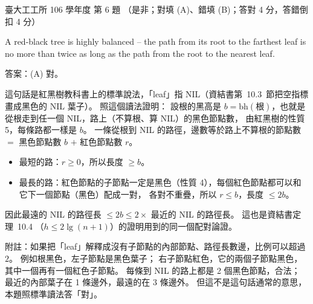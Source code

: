 \begin{pastexam}[label={px:ntu-106-ie-ds-06}]{臺大工工所 106 學年度 第 6 題}
（是非；對填 (A)、錯填 (B)；答對 4 分，答錯倒扣 4 分）

A red-black tree is highly balanced -- the path from its root to the farthest leaf is no more than
twice as long as the path from the root to the nearest leaf.
\end{pastexam}

\begin{pastsoln}
答案：(A) 對。

這句話是紅黑樹教科書上的標準說法，「leaf」指 NIL（資結書第~10.3~節把空指標畫成黑色的 NIL 葉子）。 照這個讀法證明：
設根的黑高是 $b = \mathrm{bh}(\text{根})$，也就是從根走到任一個 NIL，路上（不算根、算 NIL）的黑色節點數，
由紅黑樹的性質 5，每條路都一樣是 $b$。 一條從根到 NIL 的路徑，邊數等於路上不算根的節點數
$=$ 黑色節點數 $b$ $+$ 紅色節點數 $r$。
\begin{itemize}
\item 最短的路：$r \ge 0$，所以長度 $\ge b$。
\item 最長的路：紅色節點的子節點一定是黑色（性質 4），每個紅色節點都可以和它下一個節點（黑色）配成一對，
各對不重疊，所以 $r \le b$，長度 $\le 2b$。
\end{itemize}
因此最遠的 NIL 的路徑長 $\le 2b \le 2 \times$ 最近的 NIL 的路徑長。 這也是資結書定理~10.4
（$h \le 2\lg(n + 1)$）的證明用到的同一個配對論證。

附註：如果把「leaf」解釋成沒有子節點的內部節點、路徑長數邊，比例可以超過 $2$。 例如根黑色，左子節點是黑色葉子；
右子節點紅色，它的兩個子節點黑色，其中一個再有一個紅色子節點。 每條到 NIL 的路上都是 2 個黑色節點，合法；
最近的內部葉子在 1 條邊外，最遠的在 3 條邊外。 但這不是這句話通常的意思，本題照標準讀法答「對」。
\end{pastsoln}
